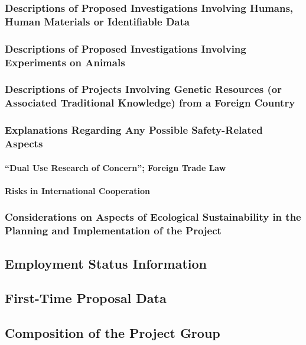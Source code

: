 \documentclass[de]{dfg-proposal}
\begin{document}
\subsubsection{Descriptions of Proposed Investigations Involving Humans, Human Materials or Identifiable Data}

\subsubsection{Descriptions of Proposed Investigations Involving Experiments on Animals}

\subsubsection{Descriptions of Projects Involving Genetic Resources (or Associated Traditional Knowledge) from a Foreign Country}

\subsubsection{Explanations Regarding Any Possible Safety-Related Aspects}

\paragraph{“Dual Use Research of Concern”; Foreign Trade Law}

\paragraph{Risks in International Cooperation}

\subsubsection{Considerations on Aspects of Ecological Sustainability in the Planning and Implementation of the Project}

\subsection{Employment Status Information}

\subsection{First-Time Proposal Data}

\subsection{Composition of the Project Group}
\end{document}
